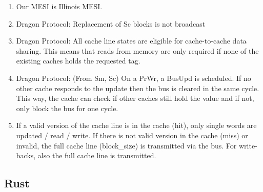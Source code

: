 \begin{enumerate}
    \item Our MESI is Illinois MESI.
    \item Dragon Protocol: Replacement of Sc blocks is not broadcast
    \item Dragon Protocol: All cache line states are eligible for cache-to-cache data sharing. This means that reads from memory are only required if none of the existing caches holds the requested tag.
    \item Dragon Protocol: (From Sm, Sc) On a PrWr, a BusUpd is scheduled. If no other cache responds to the update then the bus is cleared in the same cycle. This way, the cache can check if other caches still hold the value and if not, only block the bus for one cycle.
    \item If a valid version of the cache line is in the cache (hit), only single words are updated / read / write. If there is not valid version in the cache (miss) or invalid, the full cache line (block\_size) is transmitted via the bus. For write-backs, also the full cache line is transmitted.

\end{enumerate}

\subsection{Rust}


